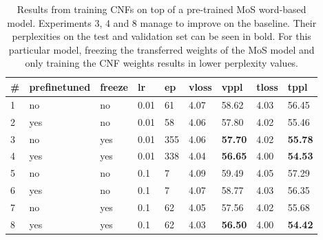 \begin{table}
\centering
\caption{Results from training CNFs on top of a pre-trained MoS word-based model. Experiments 3, 4 and 8 manage to improve on the baseline. Their perplexities on the test and validation set can be seen in bold. For this particular model, freezing the transferred weights of the MoS model and only training the CNF weights results in lower perplexity values.}

\begin{tabular}{|l|l|l|l|l|l|l|l|l|}
\hline
\textbf{\#} & \textbf{prefinetuned} & \textbf{freeze} & \textbf{lr} & \textbf{ep} & \textbf{vloss} & \textbf{vppl} & \textbf{tloss} & \textbf{tppl} \\ \hline
1       & no        & no        & 0.01      & 61        & 4.07      & 58.62     & 4.03      & 56.45 \\ \hline
2       & yes       & no        & 0.01      & 58        & 4.06      & 57.80     & 4.02      & 55.46 \\ \hline
3       & no        & yes       & 0.01      & 355       & 4.06      & \textbf{57.70}     & 4.02      & \textbf{55.78} \\ \hline
4       & yes       & yes       & 0.01      & 338       & 4.04      & \textbf{56.65}     & 4.00      & \textbf{54.53} \\ \hline
5       & no        & no        & 0.1       & 7         & 4.09      & 59.49     & 4.05      & 57.29 \\ \hline
6       & yes       & no        & 0.1       & 7         & 4.07      & 58.77     & 4.03      & 56.35 \\ \hline
7       & no        & yes       & 0.1       & 62        & 4.05      & 57.56     & 4.02      & 55.68 \\ \hline
8       & yes       & yes       & 0.1       & 62        & 4.03      & \textbf{56.50}     & 4.00      & \textbf{54.42} \\ \hline
\end{tabular}
\label{table:experiments:mos_cnf}
\end{table}

